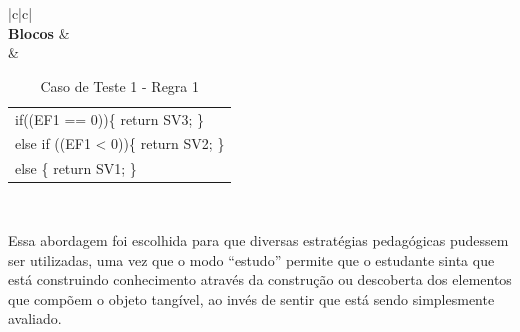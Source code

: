 \begin{table}[htb]
	\caption{Caso de Teste 1 - Regra 1}
	\centering
	\begin{tabular}{|c|c|}
		\hline
		 \\ \hline
		\textbf{Blocos} &  \\ \hline
		 & \begin{tabular}[c]{@{}l@{}} if((EF1 == 0))\{   return SV3; \}\\ else if ((EF1 < 0))\{   return SV2; \}\\ else \{   return SV1; \} \end{tabular} \\ \hline
	\end{tabular}
	\label{tabela:OTA_c1r1}
\end{table}
 
Essa abordagem foi escolhida para que diversas estratégias pedagógicas pudessem ser utilizadas, uma vez que o modo ``estudo'' permite que o estudante sinta que está construindo conhecimento através da construção ou descoberta dos elementos que compõem o objeto tangível, ao invés de sentir que está sendo simplesmente avaliado.


